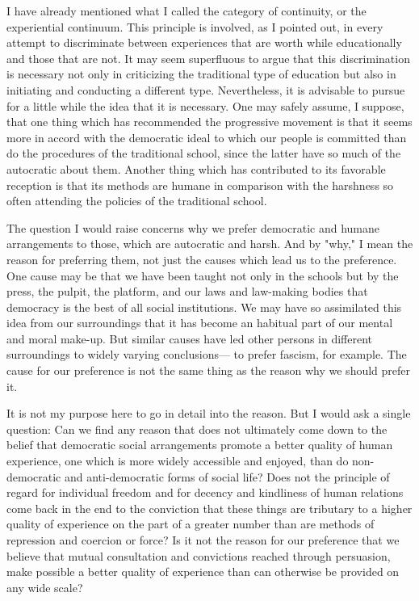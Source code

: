 I have already mentioned what I called the category of continuity, or the experiential 
continuum. This principle is involved, as I pointed out, in every attempt to discriminate 
between experiences that are worth while educationally and those that are not. It may 
seem superfluous to argue that this discrimination is necessary not only in criticizing the 
traditional type of education but also in initiating and conducting a different type. 
Nevertheless, it is advisable to pursue for a little while the idea that it is necessary. One 
may safely assume, I suppose, that one thing which has recommended the progressive 
movement is that it seems more in accord with the democratic ideal to which our people 
is committed than do the procedures of the traditional school, since the latter have so 
much of the autocratic about them. Another thing which has contributed to its favorable 
reception is that its methods are humane in comparison with the harshness so often 
attending the policies of the traditional school. 

The question I would raise concerns why we prefer democratic and humane 
arrangements to those, which are autocratic and harsh. And by "why," I mean the reason 
for preferring them, not just the causes which lead us to the preference. One cause may be 
that we have been taught not only in the schools but by the press, the pulpit, the platform, 
and our laws and law-making bodies that democracy is the best of all social institutions. 
We may have so assimilated this idea from our surroundings that it has become an 
habitual part of our mental and moral make-up. But similar causes have led other persons 
in different surroundings to widely varying conclusions— to prefer fascism, for example. 
The cause for our preference is not the same thing as the reason why we should prefer it. 

It is not my purpose here to go in detail into the reason. But I would ask a single 
question: Can we find any reason that does not ultimately come down to the belief that 
democratic social arrangements promote a better quality of human experience, one which 
is more widely accessible and enjoyed, than do non-democratic and anti-democratic 
forms of social life? Does not the principle of regard for individual freedom and for 
decency and kindliness of human relations come back in the end to the conviction that 
these things are tributary to a higher quality of experience on the part of a greater number 
than are methods of repression and coercion or force? Is it not the reason for our 
preference that we believe that mutual consultation and convictions reached through 
persuasion, make possible a better quality of experience than can otherwise be provided 
on any wide scale? 

